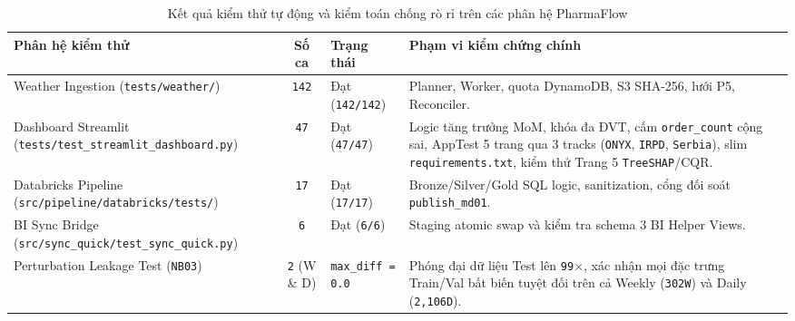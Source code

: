 \begin{table}[H]
\centering
\caption{Kết quả kiểm thử tự động và kiểm toán chống rò rỉ trên các phân hệ PharmaFlow}
\label{tab:testing_summary}
\renewcommand{\arraystretch}{1.22}
\begin{tabularx}{\textwidth}{|p{}|c|p{}|X|}
\hline
\textbf{Phân hệ kiểm thử} & \textbf{Số ca} & \textbf{Trạng thái} & \textbf{Phạm vi kiểm chứng chính} \\
\hline
Weather Ingestion (\texttt{tests/weather/}) & \texttt{142} & Đạt (\texttt{142/142}) & Planner, Worker, quota DynamoDB, S3 SHA-256, lưới P5, Reconciler. \\
\hline
Dashboard Streamlit (\texttt{tests/test\_streamlit\_dashboard.py}) & \texttt{47} & Đạt (\texttt{47/47}) & Logic tăng trưởng MoM, khóa đa ĐVT, cấm \texttt{order\_count} cộng sai, AppTest 5 trang qua 3 tracks (\texttt{ONYX}, \texttt{IRPD}, \texttt{Serbia}), slim \texttt{requirements.txt}, kiểm thử Trang 5 \texttt{TreeSHAP}/CQR. \\
\hline
Databricks Pipeline (\texttt{src/pipeline/databricks/tests/}) & \texttt{17} & Đạt (\texttt{17/17}) & Bronze/Silver/Gold SQL logic, sanitization, cổng đối soát \texttt{publish\_md01}. \\
\hline
BI Sync Bridge (\texttt{src/sync\_quick/test\_sync\_quick.py}) & \texttt{6} & Đạt (\texttt{6/6}) & Staging atomic swap và kiểm tra schema 3 BI Helper Views. \\
\hline
Perturbation Leakage Test (\texttt{NB03}) & \texttt{2} (W \& D) & \texttt{max\_diff = 0.0} & Phóng đại dữ liệu Test lên \texttt{99$\times$}, xác nhận mọi đặc trưng Train/Val bất biến tuyệt đối trên cả Weekly (\texttt{302W}) và Daily (\texttt{2,106D}). \\
\hline
\end{tabularx}
\end{table}
